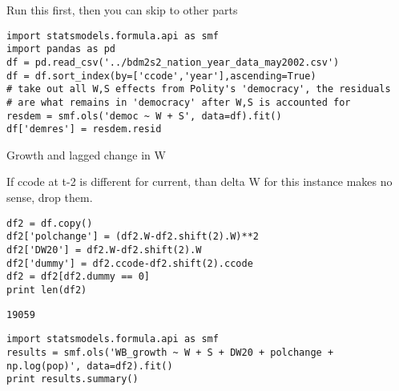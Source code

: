\documentclass[12pt,fleqn]{article}\usepackage{common}
\begin{document}

Run this first, then you can skip to other parts

\begin{verbatim}
import statsmodels.formula.api as smf
import pandas as pd
df = pd.read_csv('../bdm2s2_nation_year_data_may2002.csv')
df = df.sort_index(by=['ccode','year'],ascending=True)
# take out all W,S effects from Polity's 'democracy', the residuals
# are what remains in 'democracy' after W,S is accounted for
resdem = smf.ols('democ ~ W + S', data=df).fit()
df['demres'] = resdem.resid
\end{verbatim}



Growth and lagged change in W

If ccode at t-2 is different for current, than delta W for this instance
makes no sense, drop them.

\begin{verbatim}
df2 = df.copy()
df2['polchange'] = (df2.W-df2.shift(2).W)**2
df2['DW20'] = df2.W-df2.shift(2).W
df2['dummy'] = df2.ccode-df2.shift(2).ccode
df2 = df2[df2.dummy == 0]
print len(df2)
\end{verbatim}

\begin{verbatim}
19059
\end{verbatim}

\begin{verbatim}
import statsmodels.formula.api as smf
results = smf.ols('WB_growth ~ W + S + DW20 + polchange + np.log(pop)', data=df2).fit()
print results.summary()
\end{verbatim}
\end{document}
